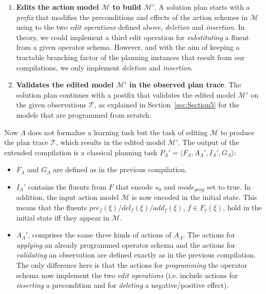\documentclass[letterpaper]{article} %
\newcommand{\tup}[1]{{\langle #1 \rangle}}
\begin{document}
\begin{enumerate}
\item {\bf Edits the action model $\mathcal{M}$ to build $\mathcal{M}'$}. A solution plan starts with a {\em prefix} that modifies the preconditions and effects of the action schemes in $\mathcal{M}$ using to the two {\em edit operations} defined above, {\em deletion} and {\em insertion}. In theory, we could implement a third edit operation for {\em substituting} a fluent from a given operator schema. However, and with the aim of keeping a tractable branching factor of the planning instances that result from our compilations, we only implement {\em deletion} and {\em insertion}.
\item {\bf Validates the edited model $\mathcal{M}'$ in the observed plan trace}. The solution plan continues with a postfix that validates the edited model $\mathcal{M}'$ on the given observations $\mathcal{T}$, as explained in Section~\ref{sec:Section5} for the models that are programmed from scratch.
\end{enumerate}

Now $\Lambda$ does not formalize a learning task but the task of editing $\mathcal{M}$ to produce the plan trace $\mathcal{T}$, which results in the edited model $\mathcal{M}'$. The output of the extended compilation is a classical planning task $P_{\Lambda}'=\tup{F_{\Lambda},A_{\Lambda}',I_{\Lambda}',G_{\Lambda}}$:

\begin{itemize}
\item $F_{\Lambda}$ and $G_{\Lambda}$ are defined as in the previous compilation.
\item $I_{\Lambda}'$ contains the fluents from $F$ that encode $s_0$ and $mode_{prog}$ set to true. In addition, the input action model $\mathcal{M}$ is now encoded in the initial state. This means that the fluents $pre_f(\xi)/del_f(\xi)/add_f(\xi)$, $f\in F_v(\xi)$, hold in the initial state iff they appear in $\mathcal{M}$.
\item $A_{\Lambda}'$, comprises the same three kinds of actions of $A_{\Lambda}$. The actions for {\em applying} an already programmed operator schema and the actions for {\em validating} an observation are defined exactly as in the previous compilation. The only difference here is that the actions for {\em programming} the operator schema now implement the two {\em edit operations} (i.e. include actions for {\em inserting} a precondition and for {\em deleting} a negative/positive effect).
\end{itemize}
\end{document}
